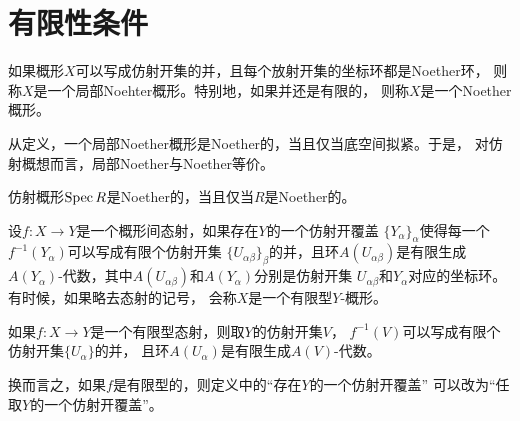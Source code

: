 \section{有限性条件}

\begin{para}[（局部）Noether概形]
	如果概形$X$可以写成仿射开集的并，且每个放射开集的坐标环都是Noether环，
	则称$X$是一个局部Noehter概形。特别地，如果并还是有限的，
	则称$X$是一个Noether概形。
\end{para}

从定义，一个局部Noether概形是Noether的，当且仅当底空间拟紧。于是，
对仿射概想而言，局部Noether与Noether等价。

\begin{pro}
	仿射概形$\operatorname{Spec} R$是Noether的，当且仅当$R$是Noether的。
\end{pro}

\begin{para}[有限型态射]
设$f:X\to Y$是一个概形间态射，如果存在$Y$的一个仿射开覆盖
$\{Y_\alpha\}_\alpha$使得每一个$f^{-1}(Y_\alpha)$可以写成有限个仿射开集
$\{U_{\alpha\beta}\}_\beta$的并，且环$A(U_{\alpha\beta})$是有限生成
$A(Y_\alpha)$-代数，其中$A(U_{\alpha\beta})$和$A(Y_\alpha)$分别是仿射开集
$U_{\alpha\beta}$和$Y_\alpha$对应的坐标环。有时候，如果略去态射的记号，
会称$X$是一个有限型$Y$-概形。
\end{para}

\begin{pro}
	如果$f:X\to Y$是一个有限型态射，则取$Y$的仿射开集$V$，
	$f^{-1}(V)$可以写成有限个仿射开集$\{U_{\alpha}\}$的并，
	且环$A(U_{\alpha})$是有限生成$A(V)$-代数。
\end{pro}

换而言之，如果$f$是有限型的，则定义中的“存在$Y$的一个仿射开覆盖”
可以改为“任取$Y$的一个仿射开覆盖”。


